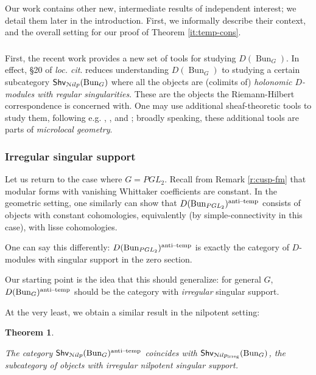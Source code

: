 \documentclass[reqno,11pt]{amsart}
\numberwithin{equation}{subsection}
\newtheorem{introthm}{Theorem}
\theoremstyle{remark}
\newcommand{\sN}{{\EuScript N}}
\newcommand{\on}{\operatorname}
\newcommand{\mathendash}{\text{\textendash}}
\newcommand{\Bun}{\on{Bun}}
\newcommand{\Shv}{\mathsf{Shv}}
\newcommand{\at}{\on{anti}\!\mathendash\!\on{temp}}
\newcommand{\Nilp}{\sN ilp}
\newcommand{\irreg}{\on{irreg}}
\begin{document}
Our work contains other new, intermediate results of independent interest; 
we detail them later in the introduction. 
First, we informally describe their context, and the
overall setting for our proof of Theorem \ref{it:temp-cons}. 

\subsubsection{}

First, the recent work \cite{agkrrv1} provides a new set of tools for studying
$D(\Bun_G)$. In effect, \S 20 of \emph{loc. cit}. reduces understanding
$D(\Bun_G)$ to studying a certain subcategory $\Shv_{\Nilp}(\Bun_G)$
where all the objects are (colimits of) \emph{holonomic $D$-modules
with regular singularities}. These are the objects the Riemann-Hilbert
correspondence is concerned with. One may use additional sheaf-theoretic
tools to study them, following e.g. \cite{kashiwara-kawai}, \cite{ginzburg-inventiones},
and \cite{ks}; broadly speaking, these additional tools are parts of
\emph{microlocal geometry}.
 
\subsubsection{Irregular singular support}

Let us return to the case where $G = PGL_2$. Recall from 
Remark \ref{r:cusp-fm} that modular forms with vanishing Whittaker
coefficients are constant. In the geometric setting,
one similarly can show that $D(\Bun_{PGL_2})^{\at}$ consists
of objects with constant cohomologies, equivalently (by simple-connectivity
in this case), with lisse cohomologies.

One can say this differently: $D(\Bun_{PGL_2})^{\at}$ is exactly the
category of $D$-modules with singular support in the zero section.

Our starting point is the idea that this should generalize: for general $G$,
$D(\Bun_G)^{\at}$ should be the category with \emph{irregular} singular
support. 

At the very least, we obtain a similar result in the nilpotent setting:

\begin{introthm}\label{it:at-irreg}

The category $\Shv_{\Nilp}(\Bun_G)^{\at}$ coincides
with $\Shv_{\Nilp_{\irreg}}(\Bun_G)$, the subcategory of objects
with \emph{irregular nilpotent singular support}.

\end{introthm}
\end{document}

